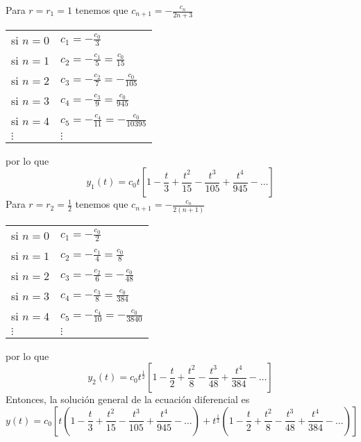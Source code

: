 \documentclass{article}
\begin{document}
\begin{enumerate}
{            Para $r=r_1=1$ tenemos que $c_{n+1}=-\frac{c_n}{2n+3}$
            \begin{center}
                \begin{tabular}{ll}
                    si $n=0$ & $c_1=-\frac{c_0}{3}$ \\
                    si $n=1$ & $c_2=-\frac{c_1}{5}=\frac{c_0}{15}$ \\
                    si $n=2$ & $c_3=-\frac{c_2}{7}=-\frac{c_0}{105}$ \\
                    si $n=3$ & $c_4=-\frac{c_3}{9}=\frac{c_0}{945}$ \\
                    si $n=4$ & $c_5=-\frac{c_4}{11}=-\frac{c_0}{10395}$ \\
                    $\vdots$ & $\vdots$
                \end{tabular}
            \end{center}
            por lo que
            \[
                y_1(t)=c_0t\left[
                    1-\frac{t}{3}+\frac{t^2}{15}-\frac{t^3}{105}+\frac{t^4}{945}-\ldots
                \right]
            \]
            Para $r=r_2=\frac{1}{2}$ tenemos que $c_{n+1}=-\frac{c_n}{2(n+1)}$
            \begin{center}
                \begin{tabular}{ll}
                    si $n=0$ & $c_1=-\frac{c_0}{2}$ \\
                    si $n=1$ & $c_2=-\frac{c_1}{4}=\frac{c_0}{8}$ \\
                    si $n=2$ & $c_3=-\frac{c_2}{6}=-\frac{c_0}{48}$ \\
                    si $n=3$ & $c_4=-\frac{c_3}{8}=\frac{c_0}{384}$ \\
                    si $n=4$ & $c_5=-\frac{c_4}{10}=-\frac{c_0}{3840}$ \\
                    $\vdots$ & $\vdots$
                \end{tabular}
            \end{center}
            por lo que
            \[
                y_2(t)=c_0t^{\frac{1}{2}}\left[
                    1-\frac{t}{2}+\frac{t^2}{8}-\frac{t^3}{48}+\frac{t^4}{384}-\ldots
                \right]
            \]
            Entonces, la solución general de la ecuación diferencial es
            \[
                y(t)=c_0\left[
                    t\left(1-\frac{t}{3}+\frac{t^2}{15}-\frac{t^3}{105}+\frac{t^4}{945}-\ldots\right)
                    +t^{\frac{1}{2}}\left(1-\frac{t}{2}+\frac{t^2}{8}-\frac{t^3}{48}+\frac{t^4}{384}-\ldots\right)
                \right]
            \]
        }


\end{enumerate}
\end{document}
